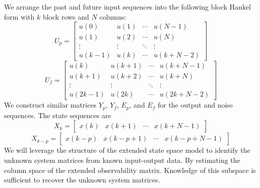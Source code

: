 We arrange the past and future input sequences into the following block Hankel form with $k$ block rows and $N$ columns:
\begin{equation*}
U_p = \begin{bmatrix}
u(0) & u(1) & \cdots & u(N-1)\\
u(1) & u(2) & \cdots & u(N)\\
\vdots & \vdots & \ddots & \vdots\\
u(k-1) & u(k) & \cdots & u(k+N-2)
\end{bmatrix}
\end{equation*}
\begin{equation*}
U_f = \begin{bmatrix}
u(k) & u(k+1) & \cdots & u(k+N-1)\\
u(k+1) & u(k+2) & \cdots & u(k+N)\\
\vdots & \vdots & \ddots & \vdots\\
u(2k-1) & u(2k) & \cdots & u(2k+N-2)
\end{bmatrix}
\end{equation*}
We construct similar matrices $Y_p$, $Y_f$, $E_p$, and $E_f$ for the output and noise sequences. The state sequences are
\begin{equation*}
X_k = \begin{bmatrix}
x(k) & x(k+1) & \cdots & x(k+N-1)
\end{bmatrix}
\end{equation*}
\begin{equation*}
X_{k-p} = \begin{bmatrix}
x(k-p) & x(k-p+1) & \cdots & x(k-p+N-1)
\end{bmatrix}
\end{equation*}
We will leverage the structure of the extended state space model to identify the unknown system matrices from known input-output data. By estimating the column space of the extended observability matrix. Knowledge of this subspace is sufficient to recover the unknown system matrices. 


